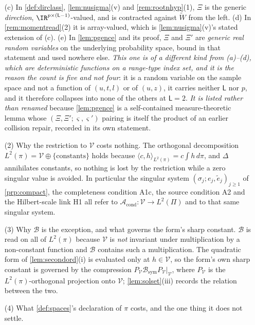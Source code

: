 \begin{remark}
\begin{enumerate}
\textup{(c)} In \cref{def:dirclass}, \cref{lem:nusigma}\textup{(v)} and \cref{rem:rootnhyp}\textup{(1)},
$\Xi$ is the generic \emph{direction}, $\IR^{p\times(\mathsf L-1)}$-valued, and is contracted against
$\widetilde W$ from the left. \textup{(d)} In \cref{rem:momentread}\textup{(2)} it is array-valued, which
is \cref{lem:nusigma}\textup{(v)}'s stated extension of \textup{(c)}.
\textup{(e)} In \cref{lem:pgence} and its proof, $\Xi$ and $\Xi'$ are \emph{generic real random
variables} on the underlying probability space, bound in that statement and used nowhere else.
\emph{This one is of a different kind from \textup{(a)}--\textup{(d)}, which are deterministic functions
on a range-type index set, and it is the reason the count is five and not four}: it is a random variable
on the sample space and not a function of $(u,t,l)$ or of $(u,z)$, it carries neither $\mathsf L$ nor
$p$, and it therefore collapses into none of the others at $\mathsf L=2$. \emph{It is listed rather than renamed} because \cref{lem:pgence} is a self-contained
measure-theoretic lemma whose $(\Xi,\Xi';\varsigma,\varsigma')$ pairing is itself the product of an
earlier collision repair, recorded in its own statement.
\item[(2)] Why the restriction to $\mathcal V$ costs nothing. The
orthogonal decomposition $L^{2}(\pi)=\mathcal V\oplus\{\text{constants}\}$ holds because
$\langle c,h\rangle_{L^2(\pi)}=c\int h\,d\pi$, and $\Delta$ annihilates constants, so nothing is lost by
the restriction while a zero singular value is avoided. In particular the singular system
$(\sigma_j;e_j,\tilde e_j)_{j\ge1}$ of \cref{prp:compact}, the completeness condition A1c, the source
condition A2 and the Hilbert-scale link H1 all refer to
$\mathcal A_{\mathrm{cond}}:\mathcal V\to L^{2}(\Pi)$ and to that same singular system.
\item[(3)] Why $\mathcal B$ is the exception, and what governs the form's sharp constant.
$\mathcal B$ is read on all of $L^{2}(\pi)$ because $\mathcal V$ is \emph{not} invariant under
multiplication by a non-constant
function and $\mathcal B$ contains such a multiplication. The quadratic form of
\cref{lem:secondord}(i) is evaluated only at $h\in\mathcal V$, so the form's own sharp constant is
governed by the compression $P_{\mathcal V}\mathcal B_{\mathrm{sym}}P_{\mathcal V}|_{\mathcal V}$, where
$P_{\mathcal V}$ is the $L^{2}(\pi)$-orthogonal projection onto $\mathcal V$; \cref{lem:solset}(iii)
records the relation between the two.
\item[(4)] What \cref{def:spaces}'s declaration of $\pi$ costs, and the one thing it does not settle.


\end{enumerate}
\end{remark}
